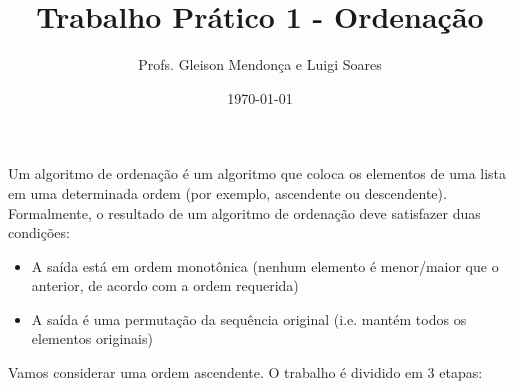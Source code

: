 \documentclass[a4paper, 11pt]{article}
\title{Trabalho Prático 1 - Ordenação}
\author{Profs. Gleison Mendonça e Luigi Soares}
\date{\today}
\title{}
\makeatletter
\let\thetitle\@title{}
\makeatother
\begin{document}
\begin{center}
\Large\bfseries\thetitle
\end{center}

Um algoritmo de ordenação é um algoritmo que coloca os elementos de uma lista
em uma determinada ordem (por exemplo, ascendente ou descendente). Formalmente,
o resultado de um algoritmo de ordenação deve satisfazer duas condições:

\begin{itemize}
\item A saída está em ordem monotônica (nenhum elemento é menor/maior que o anterior,
de acordo com a ordem requerida)
\item A saída é uma permutação da sequência original (i.e. mantém todos os elementos originais)
\end{itemize}

Vamos considerar uma ordem ascendente. O trabalho é dividido em 3 etapas:
\end{document}
